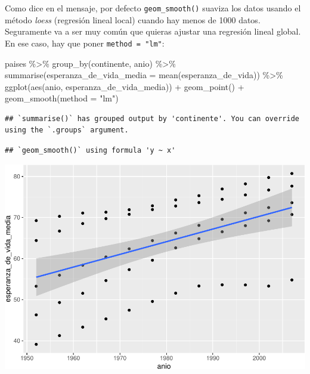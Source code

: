 \documentclass[
  openany]{book}
\newenvironment{Shaded}{\begin{snugshade}}{\end{snugshade}}
\newcommand{\AttributeTok}[1]{\textcolor[rgb]{0.77,0.63,0.00}{#1}}
\newcommand{\FunctionTok}[1]{\textcolor[rgb]{0.00,0.00,0.00}{#1}}
\newcommand{\NormalTok}[1]{#1}
\newcommand{\SpecialCharTok}[1]{\textcolor[rgb]{0.00,0.00,0.00}{#1}}
\newcommand{\StringTok}[1]{\textcolor[rgb]{0.31,0.60,0.02}{#1}}
\begin{document}
Como dice en el mensaje, por defecto \texttt{geom\_smooth()} suaviza los datos usando el método \emph{loess} (regresión lineal local) cuando hay menos de 1000 datos.
Seguramente va a ser muy común que quieras ajustar una regresión lineal global.
En ese caso, hay que poner \texttt{method\ =\ "lm"}:

\begin{Shaded}
\begin{Highlighting}[]
\NormalTok{paises }\SpecialCharTok{\%\textgreater{}\%} 
  \FunctionTok{group\_by}\NormalTok{(continente, anio) }\SpecialCharTok{\%\textgreater{}\%} 
  \FunctionTok{summarise}\NormalTok{(}\AttributeTok{esperanza\_de\_vida\_media =} \FunctionTok{mean}\NormalTok{(esperanza\_de\_vida)) }\SpecialCharTok{\%\textgreater{}\%} 
  \FunctionTok{ggplot}\NormalTok{(}\FunctionTok{aes}\NormalTok{(anio, esperanza\_de\_vida\_media)) }\SpecialCharTok{+}  
  \FunctionTok{geom\_point}\NormalTok{() }\SpecialCharTok{+}
  \FunctionTok{geom\_smooth}\NormalTok{(}\AttributeTok{method =} \StringTok{"lm"}\NormalTok{)}
\end{Highlighting}
\end{Shaded}

\begin{verbatim}
## `summarise()` has grouped output by 'continente'. You can override using the `.groups` argument.
\end{verbatim}

\begin{verbatim}
## `geom_smooth()` using formula 'y ~ x'
\end{verbatim}

\begin{center}\includegraphics[width=1\linewidth]{DT6_files/figure-latex/unnamed-chunk-56-1} \end{center}
\end{document}
